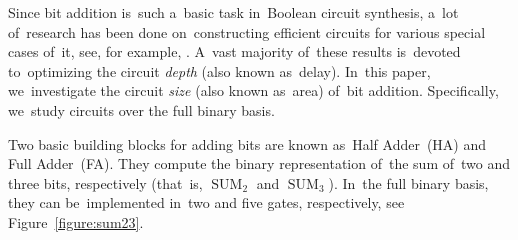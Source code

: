 \documentclass[a4paper, UKenglish, cleveref, autoref,  thm-restate]{lipics-v2021}
\DeclareMathOperator{\SUM}{SUM}
\begin{document}
    Since bit addition is~such a~basic task in~Boolean circuit synthesis,
    a~lot of~research has been done on~constructing efficient circuits
    for various special cases of~it, see, for example,
    \cite{DBLP:journals/cc/PatersonZ93,
        DBLP:conf/arith/MartelORS95,
        DBLP:journals/tc/StellingMOR98,
        DBLP:conf/arith/BickerstaffSS01}.
    A~vast majority of~these results is~devoted to~optimizing the circuit \emph{depth} (also known as~delay).
    In~this paper, we~investigate the circuit \emph{size} (also known as~area) of~bit addition. Specifically, we~study circuits over the full binary basis.

    Two basic building blocks for adding bits are known as~Half Adder~(HA)
    and Full Adder~(FA). They compute the binary representation of~the sum
    of~two and three bits, respectively (that~is, $\SUM_2$ and $\SUM_3$).
    In~the full binary basis, they can be~implemented in~two and five gates, respectively, see Figure~\ref{figure:sum23}.
\end{document}
